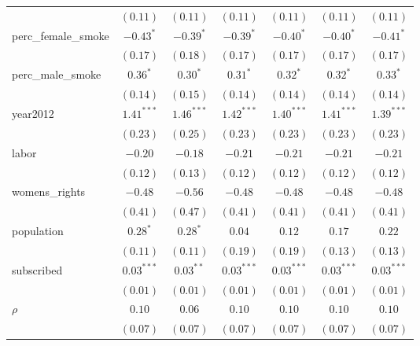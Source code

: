 \begin{table}[!h]
\begin{center}
\begin{tabular}{l c c c c c c }
                        & $(0.11)$     & $(0.11)$     & $(0.11)$     & $(0.11)$     & $(0.11)$     & $(0.11)$     \\
perc\_female\_smoke     & $-0.43^{*}$  & $-0.39^{*}$  & $-0.39^{*}$  & $-0.40^{*}$  & $-0.40^{*}$  & $-0.41^{*}$  \\
                        & $(0.17)$     & $(0.18)$     & $(0.17)$     & $(0.17)$     & $(0.17)$     & $(0.17)$     \\
perc\_male\_smoke       & $0.36^{*}$   & $0.30^{*}$   & $0.31^{*}$   & $0.32^{*}$   & $0.32^{*}$   & $0.33^{*}$   \\
                        & $(0.14)$     & $(0.15)$     & $(0.14)$     & $(0.14)$     & $(0.14)$     & $(0.14)$     \\
year2012                & $1.41^{***}$ & $1.46^{***}$ & $1.42^{***}$ & $1.40^{***}$ & $1.41^{***}$ & $1.39^{***}$ \\
                        & $(0.23)$     & $(0.25)$     & $(0.23)$     & $(0.23)$     & $(0.23)$     & $(0.23)$     \\
labor                   & $-0.20$      & $-0.18$      & $-0.21$      & $-0.21$      & $-0.21$      & $-0.21$      \\
                        & $(0.12)$     & $(0.13)$     & $(0.12)$     & $(0.12)$     & $(0.12)$     & $(0.12)$     \\
womens\_rights          & $-0.48$      & $-0.56$      & $-0.48$      & $-0.48$      & $-0.48$      & $-0.48$      \\
                        & $(0.41)$     & $(0.47)$     & $(0.41)$     & $(0.41)$     & $(0.41)$     & $(0.41)$     \\
population              & $0.28^{*}$   & $0.28^{*}$   & $0.04$       & $0.12$       & $0.17$       & $0.22$       \\
                        & $(0.11)$     & $(0.11)$     & $(0.19)$     & $(0.19)$     & $(0.13)$     & $(0.13)$     \\
subscribed              & $0.03^{***}$ & $0.03^{**}$  & $0.03^{***}$ & $0.03^{***}$ & $0.03^{***}$ & $0.03^{***}$ \\
                        & $(0.01)$     & $(0.01)$     & $(0.01)$     & $(0.01)$     & $(0.01)$     & $(0.01)$     \\
$\rho$                  & $0.10$       & $0.06$       & $0.10$       & $0.10$       & $0.10$       & $0.10$       \\
                        & $(0.07)$     & $(0.07)$     & $(0.07)$     & $(0.07)$     & $(0.07)$     & $(0.07)$     \\

\end{tabular}
\end{center}
\end{table}
